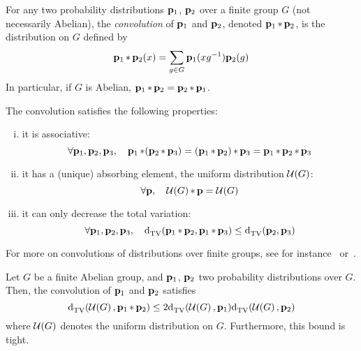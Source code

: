 \begin{definition}
For any two probability distributions $\mathbf{p}_1$, $\mathbf{p}_2$ over a finite group $G$ (not necessarily Abelian), the \emph{convolution} of $\mathbf{p}_1$ and $\mathbf{p}_2$, denoted $\mathbf{p}_1\operatorname{\ast} \mathbf{p}_2$, is the distribution on $G$ defined by
\[
  \mathbf{p}_1\operatorname{\ast} \mathbf{p}_2(x) = \sum_{g\in G} \mathbf{p}_1(x g^{-1})\mathbf{p}_2(g)
\]
In particular, if $G$ is Abelian, $\mathbf{p}_1\operatorname{\ast} \mathbf{p}_2=\mathbf{p}_2\operatorname{\ast} \mathbf{p}_1$.
\end{definition}
\begin{fact}
The convolution satisfies the following properties:
\begin{enumerate}[(i)]
  \item it is associative:
    \begin{equation}
      \forall \mathbf{p}_1,\mathbf{p}_2,\mathbf{p}_3, \quad \mathbf{p}_1\operatorname{\ast} (\mathbf{p}_2\operatorname{\ast} \mathbf{p}_3) = (\mathbf{p}_1\operatorname{\ast} \mathbf{p}_2)\operatorname{\ast} \mathbf{p}_3 = \mathbf{p}_1\operatorname{\ast} \mathbf{p}_2\operatorname{\ast} \mathbf{p}_3
    \end{equation}
  \item it has a (unique) absorbing element, the uniform distribution $\mathcal{U}\!\left( G \right) $:
    \begin{equation}
      \forall \mathbf{p}, \quad \mathcal{U}\!\left( G \right) \operatorname{\ast} \mathbf{p} = \mathcal{U}\!\left( G \right) 
    \end{equation}
  \item it can only decrease the total variation:
    \begin{equation}
      \forall \mathbf{p}_1,\mathbf{p}_2,\mathbf{p}_3, \quad {\operatorname{d}_{\textrm{TV}}^{}\!\left({ \ensuremath{\mathbf{p}}_1\operatorname{\ast}\ensuremath{\mathbf{p}}_2 ,  \ensuremath{\mathbf{p}}_1\operatorname{\ast}\ensuremath{\mathbf{p}}_3 }\right)} \leq {\operatorname{d}_{\textrm{TV}}^{}\!\left({ \ensuremath{\mathbf{p}}_2 ,  \ensuremath{\mathbf{p}}_3 }\right)}
    \end{equation}
  \end{enumerate}
\end{fact}
\noindent For more on convolutions of distributions over finite groups, see for instance~\cite{Diaconis:88} or~\cite{BCLR:08}.

\begin{fact}\label{fact:convol:uniform:tv}
Let $G$ be a finite Abelian group, and $\mathbf{p}_1$, $\mathbf{p}_2$ two probability distributions over $G$. Then, the convolution of $\mathbf{p}_1$ and $\mathbf{p}_2$ satisfies
\begin{equation}\label{eq:convol:uniform:tv}
  {\operatorname{d}_{\textrm{TV}}^{}\!\left({ \ensuremath{\mathcal{U}\!\left( G \right) } ,  \ensuremath{\mathbf{p}}_1\operatorname{\ast}\ensuremath{\mathbf{p}}_2 }\right)} \leq 2{\operatorname{d}_{\textrm{TV}}^{}\!\left({ \mathcal{U}\!\left( G \right)  ,  \mathbf{p}_1 }\right)}{\operatorname{d}_{\textrm{TV}}^{}\!\left({ \mathcal{U}\!\left( G \right)  ,  \mathbf{p}_2 }\right)}
\end{equation}
where $\mathcal{U}\!\left( G \right) $ denotes the uniform distribution on $G$. Furthermore, this bound is tight.
\end{fact}


